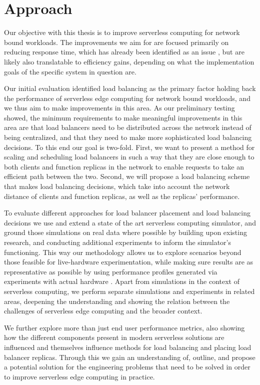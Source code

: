 \section{Approach}
Our objective with this thesis is to improve serverless computing for network bound workloads. 
The improvements we aim for are focused primarily on reducing response time, which has already been identified as an issue \cite{skippy}, but are likely also translatable to efficiency gains, depending on what the implementation goals of the specific system in question are.


Our initial evaluation identified load balancing as the primary factor holding back the performance of serverless edge computing for network bound workloads, and we thus aim to make improvements in this area.
As our preliminary testing showed, the minimum requirements to make meaningful improvements in this area are that load balancers need to be distributed across the network  instead of being centralized, and that they need to make more sophisticated load balancing decisions.
To this end our goal is two-fold.
First, we want to present a method for scaling and scheduling load balancers in such a way that they are close enough to both clients and function replicas in the network to enable requests to take an efficient path between the two.
Second, we will propose a load balancing scheme that makes load balancing decisions, which take into account the network distance of clients and function replicas, as well as the replicas' performance.


To evaluate different approaches for load balancer placement and load balancing decisions we use and extend a state of the art serverless computing simulator, and ground those simulations on real data where possible by building upon existing research\cite{philipp-da}, and conducting additional experiments to inform the simulator's functioning.
This way our methodology allows us to explore scenarios beyond those feasible for live-hardware experimentation, while making sure results are as representative as possible by using performance profiles generated via experiments with actual hardware \cite{thomas-thesis}.
Apart from simulations in the context of serverless computing, we perform separate simulations and experiments in related areas, deepening the understanding and showing the relation between the challenges of serverless edge computing and the broader context.

We further explore more than just end user performance metrics, also showing how the different components present in modern serverless solutions are influenced and themselves influence methods for load balancing and placing load balancer replicas.
Through this we gain an understanding of, outline, and propose a potential solution for the engineering problems that need to be solved in order to improve serverless edge computing in practice.